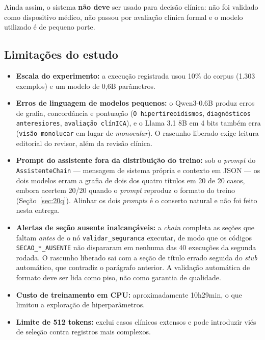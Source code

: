 \documentclass[12pt,a4paper]{article}
\begin{document}
Ainda assim, o sistema \textbf{não deve} ser usado para decisão clínica: não foi
validado como dispositivo médico, não passou por avaliação clínica formal e o
modelo utilizado é de pequeno porte.

\subsection{Limitações do estudo}

\begin{itemize}[leftmargin=*]
  \item \textbf{Escala do experimento:} a execução registrada usou 10\% do
        corpus (1.303 exemplos) e um modelo de 0,6B parâmetros.
  \item \textbf{Erros de linguagem de modelos pequenos:} o Qwen3-0.6B produz
        erros de grafia, concordância e pontuação (\texttt{O hipertireoidismos},
        \texttt{diagnósticos anteresiores}, \texttt{avaliação clínICA}), e o
        Llama 3.1 8B em 4 bits também erra (\texttt{visão monolucar} em lugar de
        \emph{monocular}). O rascunho liberado exige leitura editorial do
        revisor, além da revisão clínica.
  \item \textbf{Prompt do assistente fora da distribuição do treino:} sob o
        \emph{prompt} do \texttt{AssistenteChain} --- mensagem de sistema
        própria e contexto em JSON --- os dois modelos erram a grafia de dois dos
        quatro títulos em 20 de 20 casos, embora acertem 20/20 quando o
        \emph{prompt} reproduz o formato do treino (Seção~\ref{sec:20q}).
        Alinhar os dois \emph{prompts} é o conserto natural e não foi feito
        nesta entrega.
  \item \textbf{Alertas de seção ausente inalcançáveis:} a \emph{chain}
        completa as seções que faltam \emph{antes} de o nó
        \texttt{validar\_seguranca} executar, de modo que os códigos
        \texttt{SECAO\_*\_AUSENTE} não dispararam em nenhuma das 40 execuções
        da segunda rodada. O rascunho liberado sai com a seção de título errado
        seguida do \emph{stub} automático, que contradiz o parágrafo anterior. A
        validação automática de formato deve ser lida como piso, não como
        garantia de qualidade.
  \item \textbf{Custo de treinamento em CPU:} aproximadamente 10h29min, o que
        limitou a exploração de hiperparâmetros.
  \item \textbf{Limite de 512 tokens:} exclui casos clínicos extensos e pode
        introduzir viés de seleção contra registros mais complexos.

\end{itemize}
\end{document}
